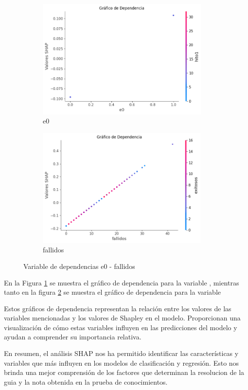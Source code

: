 \begin{figure}[H]

    \begin{subfigure}{0.5\textwidth}
        \includegraphics[width=0.9\linewidth, height=6cm]{img/shap_lr/e0.png}
        \caption{e0}
        \label{fig:dependencia_e0_lr}
    \end{subfigure}
    \begin{subfigure}{0.5\textwidth}
        \includegraphics[width=0.9\linewidth, height=6cm]{img/shap_lr/fallidos.png}
        \caption{fallidos}
        \label{fig:dependencia_fallidos_lr}
    \end{subfigure}

    \caption{Variable de dependencias e0 - fallidos}
    \label{fig:image2}
\end{figure}

En la Figura \ref{fig:dependencia_e0_lr} se muestra el gráfico de dependencia para la variable , mientras tanto en la figura \ref{fig:dependencia_fallidos_lr} se muestra el gráfico de dependencia para la variable 

Estos gráficos de dependencia representan la relación entre los valores de las variables mencionadas y los valores de Shapley en el modelo. Proporcionan una visualización de cómo estas variables influyen en las predicciones del modelo y ayudan a comprender su importancia relativa.

En resumen, el análisis SHAP nos ha permitido identificar las características y variables que más influyen en los modelos de clasificación y regresión. Esto nos brinda una mejor comprensión de los factores que determinan la resolucion de la guia y la nota obtenida en la prueba de conocimientos.



